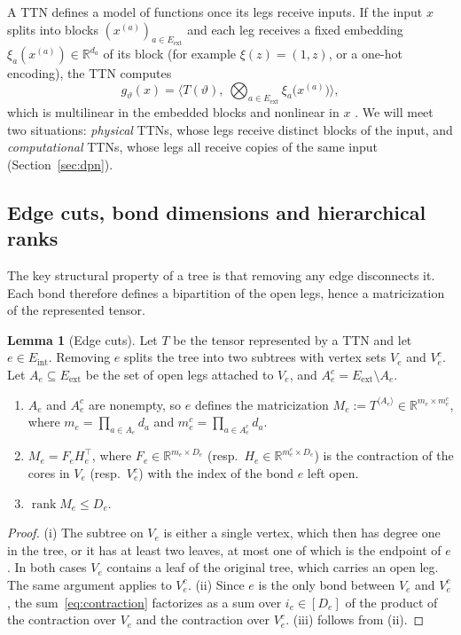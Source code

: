 \documentclass[11pt]{article}
\newcommand{\rank}{\operatorname{rank}}
\newcommand{\R}{\mathbb{R}}
\newcommand{\Eint}{E_{\mathrm{int}}}
\newcommand{\Eext}{E_{\mathrm{ext}}}
\theoremstyle{definition}
\newtheorem{lemma}[theorem]{Lemma}
\numberwithin{equation}{section}
\begin{document}
A TTN defines a model of functions once its legs receive inputs. If the input $x$ splits into blocks $(x^{(a)})_{a\in\Eext}$ and each leg receives a fixed embedding $\xi_a(x^{(a)})\in\R^{d_a}$ of its block (for example $\xi(z)=(1,z)$, or a one-hot encoding), the TTN computes
\begin{equation}\label{eq:ttn-model}
g_\vartheta(x)=\Big\langle T(\vartheta),\ \bigotimes_{a\in\Eext}\xi_a\big(x^{(a)}\big)\Big\rangle,
\end{equation}
which is multilinear in the embedded blocks and nonlinear in $x$ \citep{stoudenmire2016supervised}. We will meet two situations: \emph{physical} TTNs, whose legs receive distinct blocks of the input, and \emph{computational} TTNs, whose legs all receive copies of the same input (Section~\ref{sec:dpn}).

\subsection{Edge cuts, bond dimensions and hierarchical ranks}\label{sec:cuts}

The key structural property of a tree is that removing any edge disconnects it. Each bond therefore defines a bipartition of the open legs, hence a matricization of the represented tensor.

\begin{lemma}[Edge cuts]\label{lem:cut}
Let $T$ be the tensor represented by a TTN and let $e\in\Eint$. Removing $e$ splits the tree into two subtrees with vertex sets $V_e$ and $V_e^c$. Let $A_e\subseteq\Eext$ be the set of open legs attached to $V_e$, and $A_e^c=\Eext\setminus A_e$.
\begin{enumerate}[label=(\roman*),nosep]
\item $A_e$ and $A_e^c$ are nonempty, so $e$ defines the matricization $M_e:=T^{\langle A_e\rangle}\in\R^{m_e\times m_e^c}$, where $m_e=\prod_{a\in A_e}d_a$ and $m_e^c=\prod_{a\in A_e^c}d_a$.
\item $M_e=F_eH_e^\top$, where $F_e\in\R^{m_e\times D_e}$ (resp.\ $H_e\in\R^{m_e^c\times D_e}$) is the contraction of the cores in $V_e$ (resp.\ $V_e^c$) with the index of the bond $e$ left open.
\item $\rank M_e\le D_e$.
\end{enumerate}
\end{lemma}

\begin{proof}
(i) The subtree on $V_e$ is either a single vertex, which then has degree one in the tree, or it has at least two leaves, at most one of which is the endpoint of $e$. In both cases $V_e$ contains a leaf of the original tree, which carries an open leg. The same argument applies to $V_e^c$. (ii) Since $e$ is the only bond between $V_e$ and $V_e^c$, the sum~\eqref{eq:contraction} factorizes as a sum over $i_e\in[D_e]$ of the product of the contraction over $V_e$ and the contraction over $V_e^c$. (iii) follows from (ii).
\end{proof}
\end{document}
